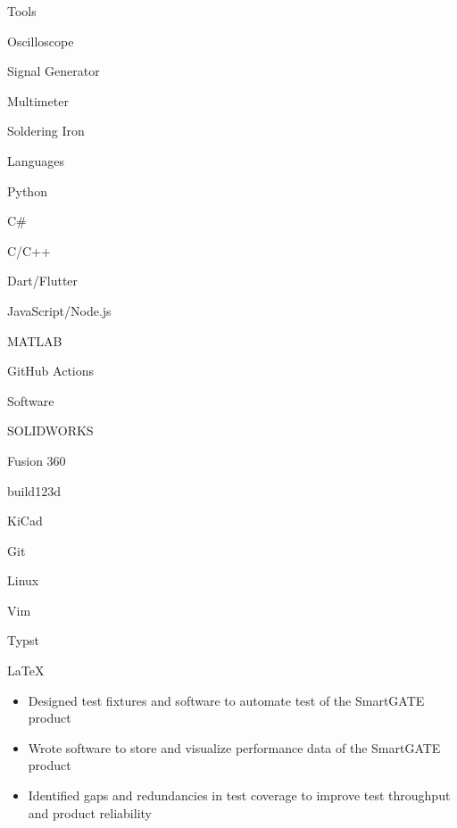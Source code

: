 \documentclass{resume}
\author{Jasper Chan}
\begin{document}
\maketitle

\vspace{-1em} %
\TechnicalSkills

\begin{TechSkills}{Tools}
    \item Oscilloscope
    \item Signal Generator
    \item Multimeter
    \item Soldering Iron
\end{TechSkills}
\begin{TechSkills}{Languages}
    \item Python
    \item C\#
    \item C/C++
    \item Dart/Flutter
    \item JavaScript/Node.js
    \item MATLAB
    \item GitHub Actions
\end{TechSkills}
\begin{TechSkills}{Software}
    \item SOLIDWORKS
    \item Fusion 360
    \item build123d
    \item KiCad
    \item Git
    \item Linux
    \item Vim
    \item Typst
    \item \LaTeX
\end{TechSkills}

\WorkExperience

\begin{itemize}
    \item Designed test fixtures and software to automate test of the SmartGATE product
    \item Wrote software to store and visualize performance data of the SmartGATE product
    \item Identified gaps and redundancies in test coverage to improve test throughput and product reliability
\end{itemize}
\end{document}
